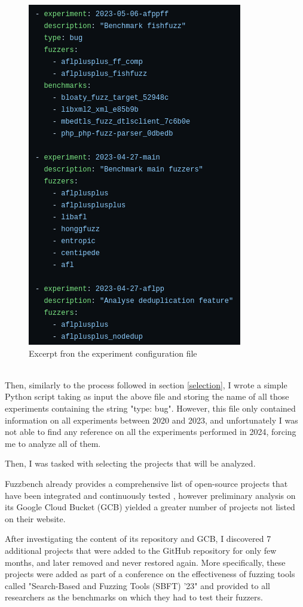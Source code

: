 \begin{figure}[h]
\centering
\includegraphics[scale=0.55]{foto/exp_yaml.png}
\caption{Excerpt fron the experiment configuration file}
\label{fig:exp_yaml}
\end{figure}
\ \\
Then, similarly to the process followed in section \ref{selection}, I wrote a simple Python script taking as input the above file and storing the name of all those experiments containing the string "type: bug".
However, this file only contained information on all experiments between 2020 and 2023, and unfortunately I was not able to find any reference on all the experiments performed in 2024, forcing me to analyze all of them.


Then, I was tasked with selecting the projects that will be analyzed.

Fuzzbench already provides a comprehensive list of open-source projects that have been integrated and continuously tested \cite{benchmarks}, however preliminary analysis on its Google Cloud Bucket (GCB) yielded a greater number of projects not listed on their website.

After investigating the content of its repository and GCB, I discovered 7 additional projects that were added to the GitHub repository for only few months, and later removed and never restored again. More specifically, these projects were added as part of a conference on the effectiveness of fuzzing tools called "Search-Based and Fuzzing Tools (SBFT) '23" \cite{sbft23} and provided to all researchers as the benchmarks on which they had to test their fuzzers.

